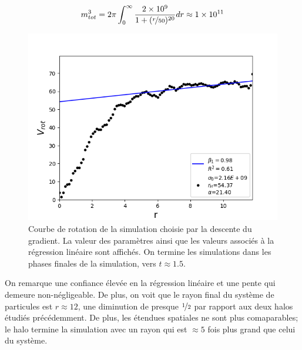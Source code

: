 \documentclass{article}
\begin{document}
\begin{equation}\label{eq:masse_halo3}
m_{tot}^3 = 2 \pi \int_{0}^{\infty} \frac{2 \times 10^9}{1+(\nicefrac{r}{50})^{20}} dr \approx 1 \times 10^{11}
\end{equation}
\begin{figure}[H]
	\centering
	\includegraphics[scale=0.7]{images/optimized/VROTOptimized3a.png}
	\caption{Courbe de rotation de la simulation choisie par la descente du gradient. La valeur des paramètres ainsi que les valeurs associés à la régression linéaire sont affichés. On termine les simulations dans les phases finales de la simulation, vers $t\approx 1.5$.}
	\label{fig:courbe_rot_opt3}
\end{figure}

On remarque une confiance élevée en la régression linéaire et une pente qui demeure non-négligeable. De plus, on voit que le rayon final du système de particules est $r \approx 12$, une diminution de presque $\nicefrac{1}{2}$ par rapport aux deux halos étudiés précédemment. De plus, les étendues spatiales ne sont plus comaparables; le halo termine la simulation avec un rayon qui est $\approx 5$ fois plus grand que celui du système.
\end{document}
